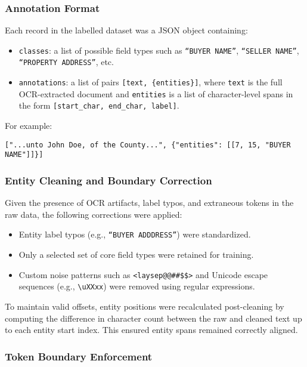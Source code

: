 \documentclass{article}
\begin{document}
\subsubsection{Annotation Format}

Each record in the labelled dataset was a JSON object containing:
\begin{itemize}
    \item \texttt{classes}: a list of possible field types such as \texttt{``BUYER NAME''}, \texttt{``SELLER NAME''}, \texttt{``PROPERTY ADDRESS''}, etc.
    \item \texttt{annotations}: a list of pairs \texttt{[text, \{entities\}]}, where \texttt{text} is the full OCR-extracted document and \texttt{entities} is a list of character-level spans in the form \texttt{[start\_char, end\_char, label]}.
\end{itemize}

For example:
\begin{verbatim}
["...unto John Doe, of the County...", {"entities": [[7, 15, "BUYER NAME"]]}]
\end{verbatim}

\subsubsection{Entity Cleaning and Boundary Correction}

Given the presence of OCR artifacts, label typos, and extraneous tokens in the raw data, the following corrections were applied:
\begin{itemize}
    \item Entity label typos (e.g., \texttt{``BUYER ADDDRESS''}) were standardized.
    \item Only a selected set of core field types were retained for training.
    \item Custom noise patterns such as \verb|<laysep@@##$$>| and Unicode escape sequences (e.g., \verb|\uXXxx|) were removed using regular expressions.
\end{itemize}

To maintain valid offsets, entity positions were recalculated post-cleaning by computing the difference in character count between the raw and cleaned text up to each entity start index. This ensured entity spans remained correctly aligned.

\subsubsection{Token Boundary Enforcement}
\end{document}
